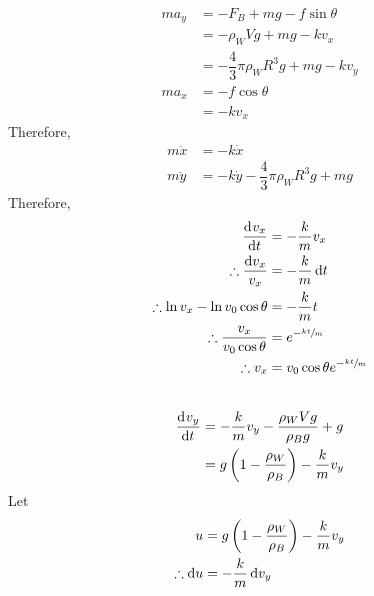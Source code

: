 \documentclass[fleqn, a4paper, 12pt]{amsart}
\theoremstyle{definition}
\theoremstyle{theorem}
\begin{document}
\\

\begin{align*}
	m a_y &= - F_B + m g - f \sin \theta\\
	&= - \rho_W V g + m g - k v_x\\
	&= - \dfrac{4}{3} \pi \rho_W R^3 g + m g - k v_y\\
	m a_x &= - f \cos \theta\\
	&= - k v_x
\end{align*}
Therefore,
\begin{align*}
	m \ddot{x} &= - k \dot{x}\\
	m \ddot{y} &= - k \dot{y} - \dfrac{4}{3} \pi \rho_W R^3 g + m g
\end{align*}
Therefore,
\begin{align*}
	\dod{v_x}{t} &= - \dfrac{k}{m} v_x\\
	\therefore \dfrac{\dif v_x}{v_x} &= - \dfrac{k}{m} \dif t\\
	\therefore \ln v_x  - \ln v_0 \cos \theta &= - \dfrac{k}{m} t \\
	\therefore \dfrac{v_x}{v_0 \cos \theta} &= e^{-\sfrac{kt}{m}}\\
	\therefore v_x &= v_0 \cos \theta e^{-\sfrac{kt}{m}}
\end{align*}
~\\
\begin{align*}
	\dod{v_y}{t} &= - \dfrac{k}{m} v_y - \dfrac{\rho_W V g}{\rho_B g} + g\\
	&= g \left( 1 - \dfrac{\rho_W}{\rho_B} \right) - \dfrac{k}{m} v_y
\end{align*}
Let 
\begin{align*}
	u &= g \left( 1 - \dfrac{\rho_W}{\rho_B} \right) - \dfrac{k}{m} v_y\\
	\therefore \dif u &= - \dfrac{k}{m} \dif v_y
\end{align*}
\end{document}

